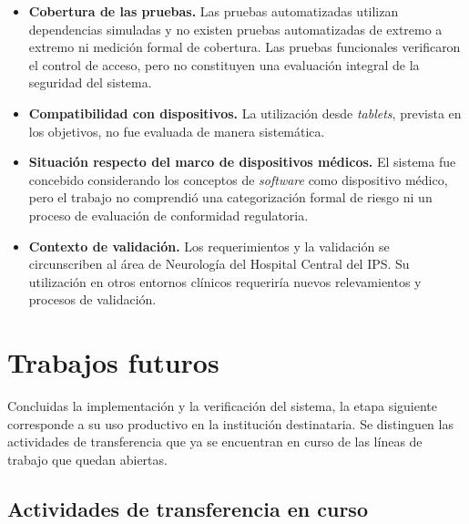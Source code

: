 \begin{itemize}
    \item \textbf{Cobertura de las pruebas.}
    Las pruebas automatizadas utilizan dependencias simuladas y no existen pruebas automatizadas de extremo a extremo ni medición formal de cobertura.
    Las pruebas funcionales verificaron el control de acceso, pero no constituyen una evaluación integral de la seguridad del sistema.

    \item \textbf{Compatibilidad con dispositivos.}
    La utilización desde \textit{tablets}, prevista en los objetivos, no fue evaluada de manera sistemática.

    \item \textbf{Situación respecto del marco de dispositivos médicos.}
    El sistema fue concebido considerando los conceptos de \textit{software} como dispositivo médico, pero el trabajo no comprendió una categorización formal de riesgo ni un proceso de evaluación de conformidad regulatoria.

    \item \textbf{Contexto de validación.}
    Los requerimientos y la validación se circunscriben al área de Neurología del Hospital Central del IPS.
    Su utilización en otros entornos clínicos requeriría nuevos relevamientos y procesos de validación.
\end{itemize}


\section{Trabajos futuros}
\label{sec:trabajos-futuros}

Concluidas la implementación y la verificación del sistema, la etapa siguiente corresponde a su uso productivo en la institución destinataria.
Se distinguen las actividades de transferencia que ya se encuentran en curso de las líneas de trabajo que quedan abiertas.

\subsection{Actividades de transferencia en curso}
\label{subsec:actividades-en-curso}

